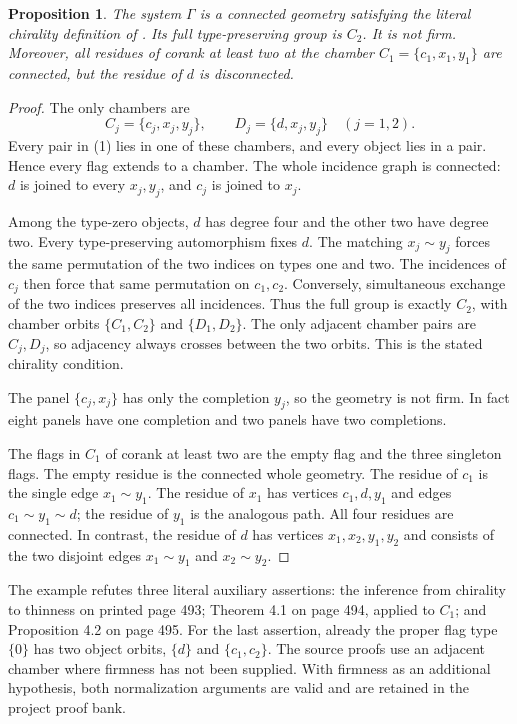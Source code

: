 \documentclass[11pt]{article}
\newtheorem{proposition}{Proposition}
\begin{document}
\begin{proposition}
The system $\Gamma$ is a connected geometry satisfying the literal
chirality definition of \cite{LT}. Its full type-preserving group is
$C_2$. It is not firm. Moreover, all residues of corank at least two
at the chamber $C_1=\{c_1,x_1,y_1\}$ are connected, but the residue
of $d$ is disconnected.
\end{proposition}
\begin{proof}
The only chambers are
\[
 C_j=\{c_j,x_j,y_j\},\qquad D_j=\{d,x_j,y_j\}
 \quad (j=1,2).
\]
Every pair in (1) lies in one of these chambers, and every object
lies in a pair. Hence every flag extends to a chamber. The whole
incidence graph is connected: $d$ is joined to every $x_j,y_j$, and
$c_j$ is joined to $x_j$.

Among the type-zero objects, $d$ has degree four and the other two
have degree two. Every type-preserving automorphism fixes $d$.
The matching $x_j\sim y_j$ forces the same permutation of the two
indices on types one and two. The incidences of $c_j$ then force
that same permutation on $c_1,c_2$. Conversely, simultaneous exchange
of the two indices preserves all incidences. Thus the full group is
exactly $C_2$, with chamber orbits $\{C_1,C_2\}$ and $\{D_1,D_2\}$.
The only adjacent chamber pairs are $C_j,D_j$, so adjacency always
crosses between the two orbits. This is the stated chirality condition.

The panel $\{c_j,x_j\}$ has only the completion $y_j$, so the
geometry is not firm. In fact eight panels have one completion and
two panels have two completions.

The flags in $C_1$ of corank at least two are the empty flag and
the three singleton flags. The empty residue is the connected whole
geometry. The residue of $c_1$ is the single edge $x_1\sim y_1$.
The residue of $x_1$ has vertices $c_1,d,y_1$ and edges
$c_1\sim y_1\sim d$; the residue of $y_1$ is the analogous path.
All four residues are connected. In contrast, the residue of $d$
has vertices $x_1,x_2,y_1,y_2$ and consists of the two disjoint edges
$x_1\sim y_1$ and $x_2\sim y_2$.
\end{proof}

The example refutes three literal auxiliary assertions: the inference
from chirality to thinness on printed page 493; Theorem 4.1 on page
494, applied to $C_1$; and Proposition 4.2 on page 495. For the last
assertion, already the proper flag type $\{0\}$ has two object orbits,
$\{d\}$ and $\{c_1,c_2\}$. The source proofs use an adjacent chamber
where firmness has not been supplied. With firmness as an additional
hypothesis, both normalization arguments are valid and are retained
in the project proof bank.
\end{document}

